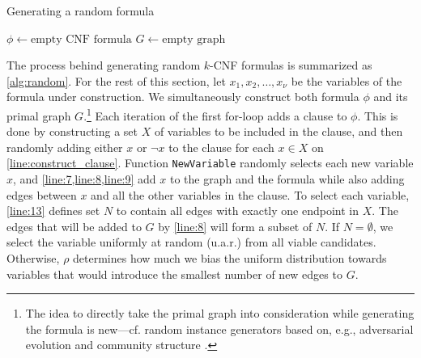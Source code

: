 \begin{algorithm}[t]
  \caption{Generating a random formula}\label{alg:random}
  $\phi \gets \text{empty CNF formula}$\;
  $G \gets \text{empty graph}$\;
  \Return{$\phi$}\;
\end{algorithm}

The process behind generating random $k$-CNF formulas is summarized as
\cref{alg:random}. For the rest of this section, let $x_1, x_2, \dots, x_\nu$ be
the variables of the formula under construction. We simultaneously construct
both formula $\phi$ and its primal graph $G$.\footnote{The idea to directly take
  the primal graph into consideration while generating the formula is new---cf.
  random \SAT{} instance generators based on, e.g., adversarial evolution
  \citep{DBLP:conf/cec/HossainALA10} and community structure
  \citep{DBLP:journals/ai/Giraldez-CruL16}.} Each iteration of the first for-loop
adds a clause to $\phi$. This is done by constructing a set $X$ of variables to
be included in the clause, and then randomly adding either $x$ or $\neg x$ to
the clause for each $x \in X$ on \cref{line:construct_clause}. Function
\texttt{NewVariable} randomly selects each new variable $x$, and
\cref{line:7,line:8,line:9} add $x$ to the graph and the formula while also
adding edges between $x$ and all the other variables in the clause. To select
each variable, \cref{line:13} defines set $N$ to contain all edges with exactly
one endpoint in $X$. The edges that will be added to $G$ by \cref{line:8} will
form a subset of $N$. If $N = \emptyset$, we select the variable uniformly at
random (u.a.r.) from all viable candidates. Otherwise, $\rho$ determines how
much we bias the uniform distribution towards variables that would introduce the
smallest number of new edges to $G$.

